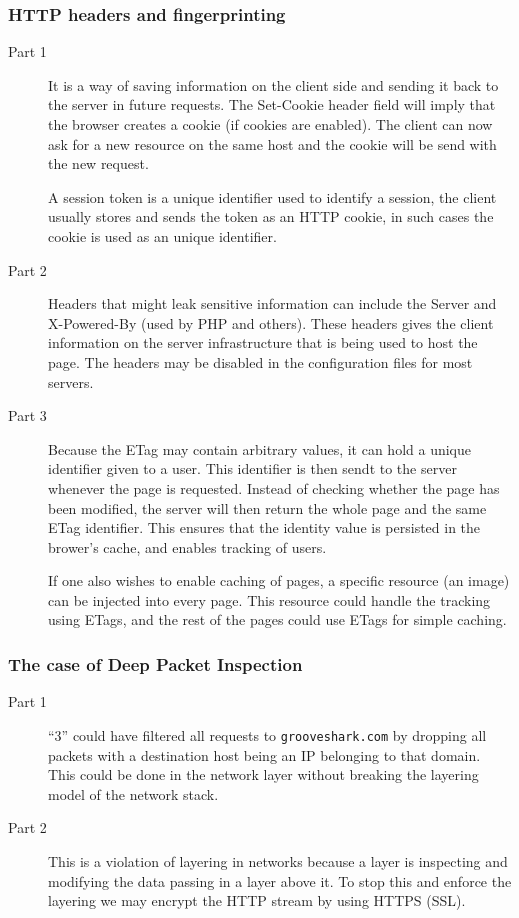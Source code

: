 \documentclass[a4paper]{article}
\begin{document}
\subsubsection{HTTP headers and fingerprinting}
\begin{description}
\item[Part 1] It is a way of saving information on the client side and sending
    it back to the server in future requests. The Set-Cookie header field will
    imply that the browser creates a cookie (if cookies are enabled). The
    client can now ask for a new resource on the same host and the cookie will
    be send with the new request.

    A session token is a unique identifier used to identify a session, the
    client usually stores and sends the token as an HTTP cookie, in such cases
    the cookie is used as an unique identifier.

\item[Part 2] Headers that might leak sensitive information can include the Server and X-Powered-By (used by PHP and others). These
    headers gives the client information on the server infrastructure that is being used to host the page. The headers may be disabled
    in the configuration files for most servers.
\item[Part 3] Because the ETag may contain arbitrary values, it can hold a unique identifier given to a user. This identifier
    is then sendt to the server whenever the page is requested. Instead of checking whether the page has been modified, the server
    will then return the whole page and the same ETag identifier. This ensures that the identity value is persisted in the brower's
    cache, and enables tracking of users.

    If one also wishes to enable caching of pages, a specific resource (an image) can be injected into every page. This resource could handle
    the tracking using ETags, and the rest of the pages could use ETags for simple caching.
\end{description}

\subsubsection{The case of Deep Packet Inspection}

\begin{description}
    \item[Part 1] ``3'' could have filtered all requests to
        \texttt{grooveshark.com} by dropping all packets with a destination
        host being an IP belonging to that domain. This could be done in the
        network layer without breaking the layering model of the network stack.
    \item[Part 2] This is a violation of layering in networks because a layer
        is inspecting and modifying the data passing in a layer above it. To
        stop this and enforce the layering we may encrypt the HTTP stream by
        using HTTPS (SSL).
\end{description}


\end{document}
